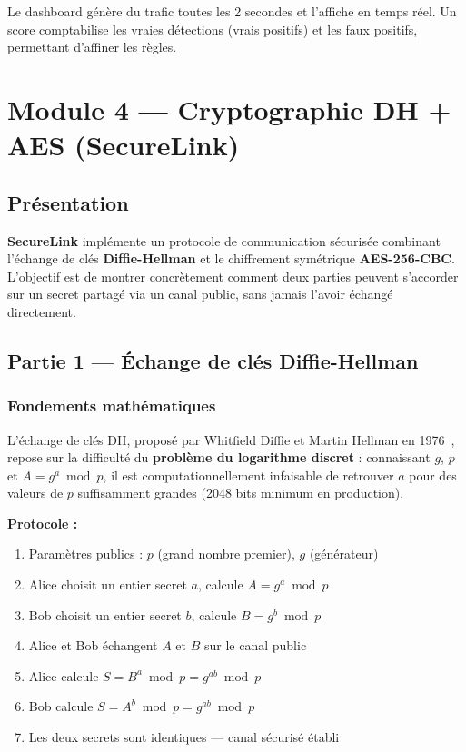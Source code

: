 \documentclass[12pt,a4paper]{report}
\begin{document}
Le dashboard génère du trafic toutes les 2 secondes et l'affiche en
temps réel. Un score comptabilise les vraies détections (vrais positifs)
et les faux positifs, permettant d'affiner les règles.

\chapter{Module 4 — Cryptographie DH + AES (SecureLink)}

\section{Présentation}

\textbf{SecureLink} implémente un protocole de communication sécurisée
combinant l'échange de clés \textbf{Diffie-Hellman} et le chiffrement
symétrique \textbf{AES-256-CBC}. L'objectif est de montrer concrètement
comment deux parties peuvent s'accorder sur un secret partagé via un
canal public, sans jamais l'avoir échangé directement.

\section{Partie 1 — Échange de clés Diffie-Hellman}

\subsection{Fondements mathématiques}

L'échange de clés DH, proposé par Whitfield Diffie et Martin Hellman
en 1976~\cite{diffie1976}, repose sur la difficulté du
\textbf{problème du logarithme discret} : connaissant $g$, $p$ et
$A = g^a \bmod p$, il est computationnellement infaisable de retrouver
$a$ pour des valeurs de $p$ suffisamment grandes (2048 bits minimum
en production).

\textbf{Protocole :}
\begin{enumerate}
  \item Paramètres publics : $p$ (grand nombre premier), $g$ (générateur)
  \item Alice choisit un entier secret $a$, calcule $A = g^a \bmod p$
  \item Bob choisit un entier secret $b$, calcule $B = g^b \bmod p$
  \item Alice et Bob échangent $A$ et $B$ sur le canal public
  \item Alice calcule $S = B^a \bmod p = g^{ab} \bmod p$
  \item Bob calcule $S = A^b \bmod p = g^{ab} \bmod p$
  \item Les deux secrets sont identiques — canal sécurisé établi
\end{enumerate}
\end{document}
